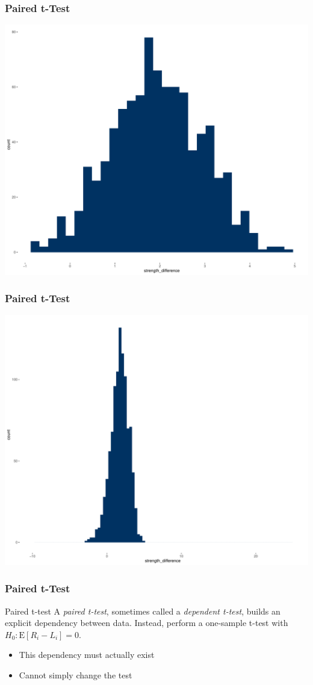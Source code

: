 \documentclass[12pt, block=fill]{beamer}
\newcommand{\E}{\text{E}}
\begin{document}
\begin{frame}
  \frametitle{Paired t-Test}
  \centering
    \includegraphics[width=.9\linewidth]{./figures/histogram_paired.pdf}
\end{frame}

\begin{frame}
  \frametitle{Paired t-Test}
  \centering
    \includegraphics[width=.9\linewidth]{./figures/histogram_paired_rescaled.pdf}
\end{frame}

\begin{frame}
  \frametitle{Paired t-Test}
  \begin{block}{Paired t-test}
    A \textit{paired t-test}, sometimes called a \textit{dependent
      t-test}, builds an explicit dependency between data.
    Instead, perform a one-sample t-test with $H_0: \E[ R_{i}- L_{i}] = 0$.
  \end{block}
  \begin{itemize}
  \item This dependency must actually exist
  \item Cannot simply change the test
  \end{itemize}
\end{frame}
\end{document}
